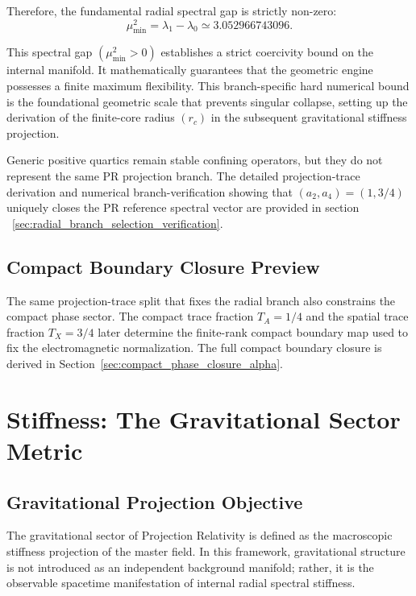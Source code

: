 \documentclass[11pt]{article}
\begin{document}
Therefore, the fundamental radial spectral gap is strictly non-zero:
\begin{equation}
\boxed{
\mu_{\min}^2
=
\lambda_1-\lambda_0
\simeq
3.052966743096.
}
\end{equation}

This spectral gap \((\mu_{\min}^2>0)\) establishes a strict coercivity bound on the internal manifold. It mathematically guarantees that the geometric engine possesses a finite maximum flexibility. This branch-specific hard numerical bound is the foundational geometric scale that prevents singular collapse, setting up the derivation of the finite-core radius \((r_c)\) in the subsequent gravitational stiffness projection.

Generic positive quartics remain stable confining operators, but they do not represent the same PR projection branch. The detailed projection-trace derivation and numerical branch-verification showing that \((a_2,a_4)=(1,3/4)\) uniquely closes the PR reference spectral vector are provided in section ~\ref{sec:radial_branch_selection_verification}.

\subsection{Compact Boundary Closure Preview}

The same projection-trace split that fixes the radial branch also constrains
the compact phase sector. The compact trace fraction \(T_A=1/4\) and the
spatial trace fraction \(T_X=3/4\) later determine the finite-rank compact
boundary map used to fix the electromagnetic normalization. The full compact
boundary closure is derived in Section~\ref{sec:compact_phase_closure_alpha}.

\section{Stiffness: The Gravitational Sector Metric}
\label{sec:stiffness_gravitational_sector}

\subsection{Gravitational Projection Objective}
\label{sec:gravitational_projection_objective}

The gravitational sector of Projection Relativity is defined as the macroscopic stiffness projection of the master field. In this framework, gravitational structure is not introduced as an independent background manifold; rather, it is the observable spacetime manifestation of internal radial spectral stiffness. 
\end{document}
